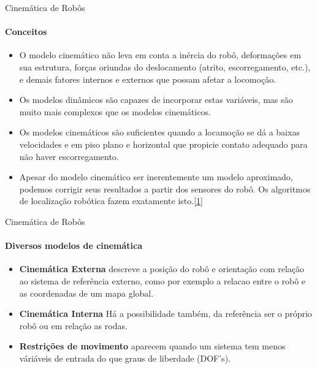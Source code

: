 \documentclass[aspectratio=169]{beamer}
\begin{document}
\begin{frame}{Cinemática de Robôs}
    \framesubtitle{Conceitos}
    \begin{itemize}
        \item O modelo cinemático não leva em conta a inércia do robô, deformações em
              sua estrutura, forças oriundas do deslocamento (atrito, escorregamento, etc.),
              e demais fatores internos e externos que possam afetar a locomoção.
        \item Os modelos dinâmicos são capazes de incorporar estas variáveis, mas são
              muito mais complexos que os modelos cinemáticos.
        \item Os modelos cinemáticos são suficientes quando a locamoção se dá a baixas
              velocidades e em piso plano e horizontal que propicie contato adequado para
              não haver escorregamento.
        \item Apesar do modelo cinemático ser inerentemente um modelo aproximado,
              podemos corrigir seus resultados a partir dos sensores do robô. Os algoritmos
              de localização robótica fazem exatamente isto.\href{http://143.106.148.168:9080/Cursos/IA368N/01-16/cinematica2.pdf}{[1]}
    \end{itemize}
\end{frame}

\begin{frame}{Cinemática de Robôs}
    \framesubtitle{Diversos modelos de cinemática}
    \begin{itemize}
        \item \textbf{Cinemática Externa} descreve a posição do robô e orientação com relação ao sistema de referência externo, como por exemplo a relacao entre o robô e as coordenadas de um mapa global.
        \item \textbf{Cinemática Interna} Há a possibilidade também, da referência ser o próprio robô ou em relação as rodas.
        \item \textbf{Restrições de movimento} aparecem quando um sistema tem menos váriáveis de entrada do que graus de liberdade (DOF's).
    \end{itemize}
\end{frame}
\end{document}
